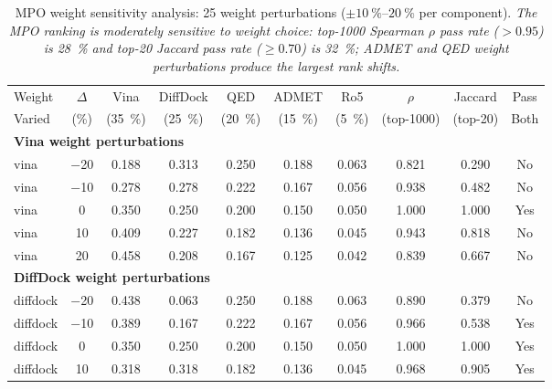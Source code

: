 \documentclass[journal=jcisd8,manuscript=suppinfo]{achemso}
\begin{document}
\begin{table}[!htbp]
\centering
\caption{MPO weight sensitivity analysis: \num{25} weight perturbations ($\pm \qtyrange{10}{20}{\percent}$ per component). \textit{The MPO ranking is moderately sensitive to weight choice: top-1000 Spearman $\rho$ pass rate ($>\num{0.95}$) is \qty{28}{\percent} and top-20 Jaccard pass rate ($\geq \num{0.70}$) is \qty{32}{\percent}; ADMET and QED weight perturbations produce the largest rank shifts.}}
\label{tab:sm_s17_mpo_sensitivity}
\small
\begin{tabular}{lccccccccc}
\toprule
Weight & $\Delta$ & Vina & DiffDock & QED & ADMET & Ro5 & $\rho$ & Jaccard & Pass \\
Varied & (\unit{\percent}) & (\qty{35}{\percent}) & (\qty{25}{\percent}) & (\qty{20}{\percent}) & (\qty{15}{\percent}) & (\qty{5}{\percent}) & (top-1000) & (top-20) & Both \\
\midrule
\multicolumn{10}{l}{\textbf{Vina weight perturbations}} \\
vina & \num{-20} & \num{0.188} & \num{0.313} & \num{0.250} & \num{0.188} & \num{0.063} & \num{0.821} & \num{0.290} & No \\
vina & \num{-10} & \num{0.278} & \num{0.278} & \num{0.222} & \num{0.167} & \num{0.056} & \num{0.938} & \num{0.482} & No \\
vina & \num{0} & \num{0.350} & \num{0.250} & \num{0.200} & \num{0.150} & \num{0.050} & \num{1.000} & \num{1.000} & Yes \\
vina & \num{+10} & \num{0.409} & \num{0.227} & \num{0.182} & \num{0.136} & \num{0.045} & \num{0.943} & \num{0.818} & No \\
vina & \num{+20} & \num{0.458} & \num{0.208} & \num{0.167} & \num{0.125} & \num{0.042} & \num{0.839} & \num{0.667} & No \\
\midrule
\multicolumn{10}{l}{\textbf{DiffDock weight perturbations}} \\
diffdock & \num{-20} & \num{0.438} & \num{0.063} & \num{0.250} & \num{0.188} & \num{0.063} & \num{0.890} & \num{0.379} & No \\
diffdock & \num{-10} & \num{0.389} & \num{0.167} & \num{0.222} & \num{0.167} & \num{0.056} & \num{0.966} & \num{0.538} & Yes \\
diffdock & \num{0} & \num{0.350} & \num{0.250} & \num{0.200} & \num{0.150} & \num{0.050} & \num{1.000} & \num{1.000} & Yes \\
diffdock & \num{+10} & \num{0.318} & \num{0.318} & \num{0.182} & \num{0.136} & \num{0.045} & \num{0.968} & \num{0.905} & Yes \\

\end{tabular}
\end{table}
\end{document}
